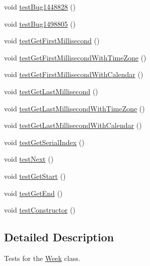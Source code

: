 \begin{DoxyCompactItemize}
\item 
void \mbox{\hyperlink{classorg_1_1jfree_1_1data_1_1time_1_1_week_test_adf33b81826b1e4f4861e14d07a344d99}{test\+Bug1448828}} ()
\item 
void \mbox{\hyperlink{classorg_1_1jfree_1_1data_1_1time_1_1_week_test_a82057761926d54452b0b1d140b3e0c84}{test\+Bug1498805}} ()
\item 
void \mbox{\hyperlink{classorg_1_1jfree_1_1data_1_1time_1_1_week_test_ac22a60f8cbf70b5c3593c8d53e0fc430}{test\+Get\+First\+Millisecond}} ()
\item 
void \mbox{\hyperlink{classorg_1_1jfree_1_1data_1_1time_1_1_week_test_a68777b5c64f8e2a527b0d77bc9510118}{test\+Get\+First\+Millisecond\+With\+Time\+Zone}} ()
\item 
void \mbox{\hyperlink{classorg_1_1jfree_1_1data_1_1time_1_1_week_test_ae906c200cadc6d55c455d81a5c1d11e4}{test\+Get\+First\+Millisecond\+With\+Calendar}} ()
\item 
void \mbox{\hyperlink{classorg_1_1jfree_1_1data_1_1time_1_1_week_test_af5280552ff9d08d19752a02deb141de2}{test\+Get\+Last\+Millisecond}} ()
\item 
void \mbox{\hyperlink{classorg_1_1jfree_1_1data_1_1time_1_1_week_test_a145be30afabe001fa1e824e0d876aa37}{test\+Get\+Last\+Millisecond\+With\+Time\+Zone}} ()
\item 
void \mbox{\hyperlink{classorg_1_1jfree_1_1data_1_1time_1_1_week_test_aaa7824626d6a498749a613e0a19c6dd2}{test\+Get\+Last\+Millisecond\+With\+Calendar}} ()
\item 
void \mbox{\hyperlink{classorg_1_1jfree_1_1data_1_1time_1_1_week_test_a3971e39af4b4926659dbf720c9817bcd}{test\+Get\+Serial\+Index}} ()
\item 
void \mbox{\hyperlink{classorg_1_1jfree_1_1data_1_1time_1_1_week_test_ad4e2570f132e4f070dd958b56f3ba114}{test\+Next}} ()
\item 
void \mbox{\hyperlink{classorg_1_1jfree_1_1data_1_1time_1_1_week_test_a3c45d7fd385495641ec945ad080ba09e}{test\+Get\+Start}} ()
\item 
void \mbox{\hyperlink{classorg_1_1jfree_1_1data_1_1time_1_1_week_test_a0bf606f9ca2ca3ce00e19364565b4439}{test\+Get\+End}} ()
\item 
void \mbox{\hyperlink{classorg_1_1jfree_1_1data_1_1time_1_1_week_test_ae8bec87b1d7ec5eb6cab620f821dd5a2}{test\+Constructor}} ()
\end{DoxyCompactItemize}


\subsection{Detailed Description}
Tests for the \mbox{\hyperlink{classorg_1_1jfree_1_1data_1_1time_1_1_week}{Week}} class. 

